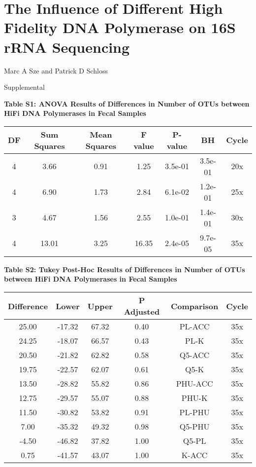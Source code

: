 \documentclass[12pt,]{article}
\title{}
\author{}
\date{}
\begin{document}
\section{The Influence of Different High Fidelity DNA Polymerase on 16S
rRNA
Sequencing}\label{the-influence-of-different-high-fidelity-dna-polymerase-on-16s-rrna-sequencing}

\vspace{10mm}

\begin{center}
Marc A Sze and Patrick D Schloss

\vspace{10mm}

Supplemental
\end{center}

\newpage

\textbf{Table S1: ANOVA Results of Differences in Number of OTUs between
HiFi DNA Polymerases in Fecal Samples}

\begin{longtable}[]{@{}ccccccc@{}}
\toprule
DF & Sum Squares & Mean Squares & F value & P-value & BH &
Cycle\tabularnewline
\midrule
\endhead
4 & 3.66 & 0.91 & 1.25 & 3.5e-01 & 3.5e-01 & 20x\tabularnewline
4 & 6.90 & 1.73 & 2.84 & 6.1e-02 & 1.2e-01 & 25x\tabularnewline
3 & 4.67 & 1.56 & 2.55 & 1.0e-01 & 1.4e-01 & 30x\tabularnewline
4 & 13.01 & 3.25 & 16.35 & 2.4e-05 & 9.7e-05 & 35x\tabularnewline
\bottomrule
\end{longtable}

\newpage

\textbf{Table S2: Tukey Post-Hoc Results of Differences in Number of
OTUs between HiFi DNA Polymerases in Fecal Samples}

\begin{longtable}[]{@{}cccccc@{}}
\toprule
Difference & Lower & Upper & P Adjusted & Comparison &
Cycle\tabularnewline
\midrule
\endhead
25.00 & -17.32 & 67.32 & 0.40 & PL-ACC & 35x\tabularnewline
24.25 & -18.07 & 66.57 & 0.43 & PL-K & 35x\tabularnewline
20.50 & -21.82 & 62.82 & 0.58 & Q5-ACC & 35x\tabularnewline
19.75 & -22.57 & 62.07 & 0.61 & Q5-K & 35x\tabularnewline
13.50 & -28.82 & 55.82 & 0.86 & PHU-ACC & 35x\tabularnewline
12.75 & -29.57 & 55.07 & 0.88 & PHU-K & 35x\tabularnewline
11.50 & -30.82 & 53.82 & 0.91 & PL-PHU & 35x\tabularnewline
7.00 & -35.32 & 49.32 & 0.98 & Q5-PHU & 35x\tabularnewline
-4.50 & -46.82 & 37.82 & 1.00 & Q5-PL & 35x\tabularnewline
0.75 & -41.57 & 43.07 & 1.00 & K-ACC & 35x\tabularnewline
\bottomrule
\end{longtable}
\end{document}
